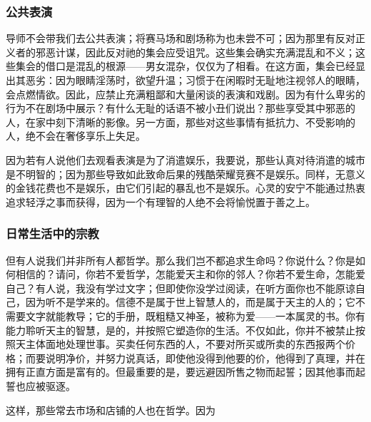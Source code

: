 
\subsubsection{公共表演}

导师不会带我们去公共表演；将赛马场和剧场称为也未尝不可；因为那里有反对正义者的邪恶计谋，因此反对祂的集会应受诅咒。这些集会确实充满混乱和不义；这些集会的借口是混乱的根源——男女混杂，仅仅为了相看。在这方面，集会已经显出其恶劣：因为眼睛淫荡时，欲望升温；习惯于在闲暇时无耻地注视邻人的眼睛，会点燃情欲。因此，应禁止充满粗鄙和大量闲谈的表演和戏剧。因为有什么卑劣的行为不在剧场中展示？有什么无耻的话语不被小丑们说出？那些享受其中邪恶的人，在家中刻下清晰的影像。另一方面，那些对这些事情有抵抗力、不受影响的人，绝不会在奢侈享乐上失足。\par

因为若有人说他们去观看表演是为了消遣娱乐，我要说，那些认真对待消遣的城市是不明智的；因为那些导致如此致命后果的残酷荣耀竞赛不是娱乐。同样，无意义的金钱花费也不是娱乐，由它们引起的暴乱也不是娱乐。心灵的安宁不能通过热衷追求轻浮之事而获得，因为一个有理智的人绝不会将愉悦置于善之上。\par


\subsubsection{日常生活中的宗教}

但有人说我们并非所有人都哲学。那么我们岂不都追求生命吗？你说什么？你是如何相信的？请问，你若不爱哲学，怎能爱天主和你的邻人？你若不爱生命，怎能爱自己？有人说，我没有学过文字；但即使你没学过阅读，在听方面你也不能原谅自己，因为听不是学来的。信德不是属于世上智慧人的，而是属于天主的人的；它不需要文字就能教导；它的手册，既粗糙又神圣，被称为爱——一本属灵的书。你有能力聆听天主的智慧，是的，并按照它塑造你的生活。不仅如此，你并不被禁止按照天主体面地处理世事。买卖任何东西的人，不要对所买或所卖的东西报两个价格；而要说明净价，并努力说真话，即使他没得到他要的价，他得到了真理，并在拥有正直方面是富有的。但最重要的是，要远避因所售之物而起誓；因其他事而起誓也应被驱逐。\par

这样，那些常去市场和店铺的人也在哲学。因为\par

